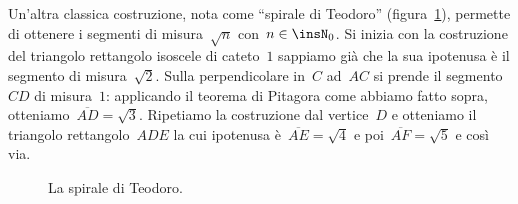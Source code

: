 Un'altra classica costruzione, nota come ``spirale di Teodoro'' 
(figura~\ref{fig:D.4}), permette di ottenere i segmenti di misura~$\sqrt{n}$ 
con~$n\in \insN_{0}$.
Si inizia con la costruzione del triangolo rettangolo isoscele di cateto~$1$ 
sappiamo già che la sua ipotenusa è il segmento
di misura~$\sqrt{2}$. Sulla perpendicolare in~$C$ ad~$AC$ si prende il 
segmento~$CD$ di misura~$1$:
applicando il teorema di Pitagora come abbiamo fatto sopra, 
otteniamo~$\overline{AD}=\sqrt{3}$.
Ripetiamo la costruzione dal vertice~$D$ e otteniamo il triangolo 
rettangolo~$ADE$ la cui ipotenusa è~$\overline{AE}=\sqrt{4}$
e poi~$\overline{AF}=\sqrt{5}$ e così via.
\begin{inaccessibleblock}
 \begin{figure}[t]
 \centering\vspace{-15ex}
 \caption{La spirale di Teodoro.}\label{fig:D.4}
\end{figure}
\end{inaccessibleblock}

